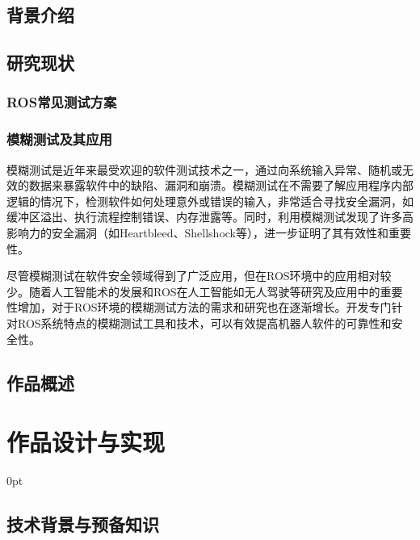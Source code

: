 \documentclass[zihao=-4]{ctexart}
\newcommand{\setParDis}{\setlength {\parskip} {0pt} }
\begin{document}
\begin{spacing}{1.5} %


\subsection{背景介绍} %


\subsection{研究现状}

\subsubsection{ROS常见测试方案}


\subsubsection{模糊测试及其应用}
模糊测试是近年来最受欢迎的软件测试技术之一，通过向系统输入异常、随机或无效的数据来暴露软件中的缺陷、漏洞和崩溃。模糊测试在不需要了解应用程序内部逻辑的情况下，检测软件如何处理意外或错误的输入，非常适合寻找安全漏洞，如缓冲区溢出、执行流程控制错误、内存泄露等。同时，利用模糊测试发现了许多高影响力的安全漏洞（如Heartbleed、Shellshock等），进一步证明了其有效性和重要性。

尽管模糊测试在软件安全领域得到了广泛应用，但在ROS环境中的应用相对较少。随着人工智能术的发展和ROS在人工智能如无人驾驶等研究及应用中的重要性增加，对于ROS环境的模糊测试方法的需求和研究也在逐渐增长。开发专门针对ROS系统特点的模糊测试工具和技术，可以有效提高机器人软件的可靠性和安全性。

\subsection{作品概述}



\section{作品设计与实现}
\setParDis %

\subsection{技术背景与预备知识} %





\end{spacing}
\end{document}
